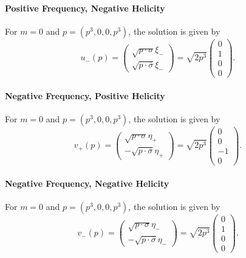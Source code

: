 \documentclass{article}
\begin{document}
\paragraph*{Positive Frequency, Negative Helicity}
For $m=0$ and $p=(p^3,0,0,p^3)$, the solution is given by
\[ u_-(p) = \begin{pmatrix}
    \sqrt{p\cdot \sigma} \xi_- \\
    \sqrt{p\cdot \overline{\sigma}} \xi_-
\end{pmatrix} = \sqrt{2p^3} \begin{pmatrix}
    0 \\ 1 \\ 0 \\ 0
\end{pmatrix}. \]
\paragraph*{Negative Frequency, Positive Helicity}
For $m=0$ and $p=(p^3,0,0,p^3)$, the solution is given by
\[ v_+(p) = \begin{pmatrix}
    \sqrt{p\cdot \sigma} \eta_+ \\
    -\sqrt{p\cdot \overline{\sigma}} \eta_+
\end{pmatrix} = \sqrt{2p^3} \begin{pmatrix}
    0 \\ 0 \\ -1 \\ 0
\end{pmatrix}. \]
\paragraph*{Negative Frequency, Negative Helicity}
For $m=0$ and $p=(p^3,0,0,p^3)$, the solution is given by
\[ v_-(p) = \begin{pmatrix}
    \sqrt{p\cdot \sigma} \eta_- \\
    -\sqrt{p\cdot \overline{\sigma}} \eta_-
\end{pmatrix} = \sqrt{2p^3} \begin{pmatrix}
    0 \\ 1 \\ 0 \\ 0
\end{pmatrix}. \]
\end{document}
